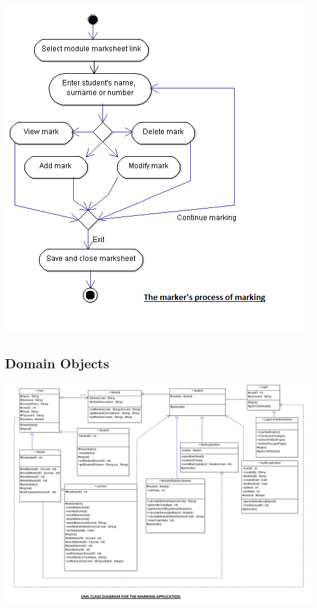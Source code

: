 \documentclass[12pt]{article}
\begin{document}
  \begin{center}
  \includegraphics[width=130mm]{Tutorsmarkingmoduleactivities.png}  
  \end{center}
 \subsection{Domain Objects}
  \begin{center}
  \advance\leftskip-3cm
  \includegraphics[width=200mm]{UMLTechnologies.png}  
  \end{center}
\end{document}
